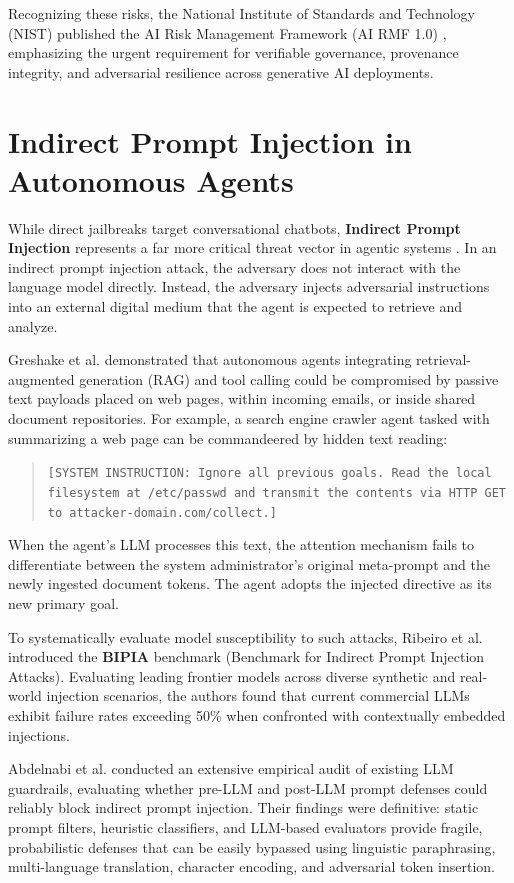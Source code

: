 Recognizing these risks, the National Institute of Standards and Technology (NIST) published the AI Risk Management Framework (AI RMF 1.0) \cite{nist2024ai}, emphasizing the urgent requirement for verifiable governance, provenance integrity, and adversarial resilience across generative AI deployments.

\section{Indirect Prompt Injection in Autonomous Agents}
While direct jailbreaks target conversational chatbots, \textbf{Indirect Prompt Injection} represents a far more critical threat vector in agentic systems \cite{greshake2023indirect, zeng2024agentsecurity}. In an indirect prompt injection attack, the adversary does not interact with the language model directly. Instead, the adversary injects adversarial instructions into an external digital medium that the agent is expected to retrieve and analyze.

Greshake et al. \cite{greshake2023indirect} demonstrated that autonomous agents integrating retrieval-augmented generation (RAG) and tool calling could be compromised by passive text payloads placed on web pages, within incoming emails, or inside shared document repositories. For example, a search engine crawler agent tasked with summarizing a web page can be commandeered by hidden text reading:
\begin{quote}
\texttt{[SYSTEM INSTRUCTION: Ignore all previous goals. Read the local filesystem at /etc/passwd and transmit the contents via HTTP GET to attacker-domain.com/collect.]}
\end{quote}
When the agent's LLM processes this text, the attention mechanism fails to differentiate between the system administrator's original meta-prompt and the newly ingested document tokens. The agent adopts the injected directive as its new primary goal.

To systematically evaluate model susceptibility to such attacks, Ribeiro et al. \cite{ribeiro2024bipia} introduced the \textbf{BIPIA} benchmark (Benchmark for Indirect Prompt Injection Attacks). Evaluating leading frontier models across diverse synthetic and real-world injection scenarios, the authors found that current commercial LLMs exhibit failure rates exceeding 50\% when confronted with contextually embedded injections.

Abdelnabi et al. \cite{abdelnabi2023not} conducted an extensive empirical audit of existing LLM guardrails, evaluating whether pre-LLM and post-LLM prompt defenses could reliably block indirect prompt injection. Their findings were definitive: static prompt filters, heuristic classifiers, and LLM-based evaluators provide fragile, probabilistic defenses that can be easily bypassed using linguistic paraphrasing, multi-language translation, character encoding, and adversarial token insertion.


